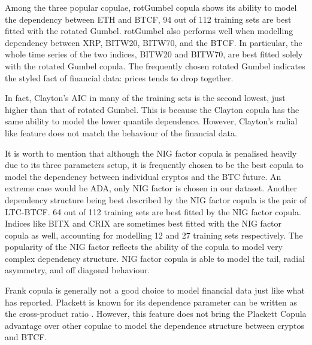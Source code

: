 Among the three popular copulae, rotGumbel copula shows its ability to model the dependency between ETH and BTCF,
94 out of 112 training sets are best fitted with the rotated Gumbel.
rotGumbel also performs well when modelling dependency between XRP, BITW20, BITW70, and the BTCF.
In particular, the whole time series of the two indices, BITW20 and BITW70, are best fitted solely with the rotated Gumbel copula.
The frequently chosen rotated Gumbel indicates the styled fact of financial data: prices tends to drop together.  \medskip




In fact, Clayton's AIC in many of the training sets is the second lowest, just higher than that of rotated Gumbel.
This is because the Clayton copula has the same ability to model the lower quantile dependence.
However, Clayton's radial like feature does not match the behaviour of the financial data. \medskip

It is worth to mention that although the NIG factor copula is penalised heavily due to its three parameters setup, it is frequently chosen to be the best copula to model the dependency between individual cryptos and the BTC future.
An extreme case would be ADA, only NIG factor is chosen in our dataset.
Another dependency structure being best described by the NIG factor copula is the pair of LTC-BTCF.
64 out of 112 training sets are best fitted by the NIG factor copula.
Indices like BITX and CRIX are sometimes best fitted with the NIG factor copula as well, accounting for modelling 12 and 27 training sets respectively.
The popularity of the NIG factor reflects the ability of the copula to model very complex dependency structure.
NIG factor copula is able to model the tail, radial asymmetry, and off diagonal behaviour.  \medskip %

Frank copula is generally not a good choice to model financial data just like what \cite{barbi2014copula} has reported.
Plackett is known for its dependence parameter can be written as the cross-product ratio \citep{joe1997multivariate}.
However, this feature does not bring the Plackett Copula advantage over other copulae to model the dependence structure between cryptos and BTCF. \medskip

